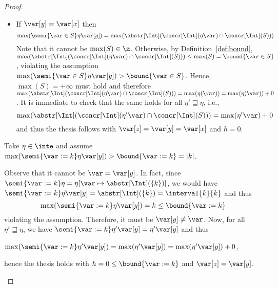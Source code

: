 \begin{proof}
\begin{inductive}
\begin{itemize}
    \item If \(\var[y] = \var[x]\) then
      \begin{equation*}
        \max(\semi{\var \in S}\eta \var[y]) = \max(\abstr[\Int](\concr[\Int](\eta\var) \cap \concr[\Int](S)))
      \end{equation*}
      Note that it cannot be \(\max(S)\in \z\). Otherwise, by
      Definition~\ref{def:bound},
      \(\max ({\abstr[\Int](\concr[\Int](\eta\var) \cap \concr[\Int](S))})
      \leq \max(S)= \bound{\var \in S}\), violating the assumption
      \(\max(\semi{\var \in S}\eta \var[y]) > \bound{\var \in S}\).
      Hence, \(\max(S) = +\infty\) must hold and therefore %
      \(\max ({\abstr[\Int](\concr[\Int](\eta\var) \cap
        \concr[\Int](S))}) = \max(\eta(\var)) = \max(\eta(\var)) +
      0\). It is immediate to check that the same holds for all
      \(\eta' \sqsupseteq \eta\), i.e.,
      \begin{equation*}
        \max(\abstr[\Int](\concr[\Int](\eta'\var) \cap \concr[\Int](S))) = \max(\eta'\var) + 0
      \end{equation*}
      and thus the thesis follows with  \(\var[z]=\var[y]=\var[x]\) and \(h=0\).
    \end{itemize}  
    
    Take \(\eta \in \inte\) and assume
    \(\max(\semi{\var := k}\eta \var[y]) > \bound{\var := k} = |k|\).

    Observe that it cannot be \(\var = \var[y]\). In fact, since
    \(\semi{\var := k}\eta = \eta[\var \mapsto \abstr[\Int](\{k\})]\),
    we would have
    \(\semi{\var := k}\eta \var[y] = \abstr[\Int](\{k\}) =
    \interval{k}{k}\) and thus %
    \begin{equation*}
      \max(\semi{\var := k}\eta \var[y]) = k  \leq \bound{\var := k}
    \end{equation*}
    violating the assumption.
    Therefore, it must be \(\var[y] \neq \var\). Now, for all
    \(\eta' \sqsupseteq \eta\), we have
    \(\semi{\var := k}\eta' \var[y] = \eta' \var[y]\) and thus
    \begin{center}
      \(\max(\semi{\var := k}\eta' \var[y]) = \max(\eta' \var[y]) =
      \max(\eta' \var[y]) + 0\),
    \end{center}
    hence the thesis holds with \(h =0 \leq \bound{\var :=k}\) and \(\var[z] = \var[y]\).
    

\end{inductive}
\end{proof}
